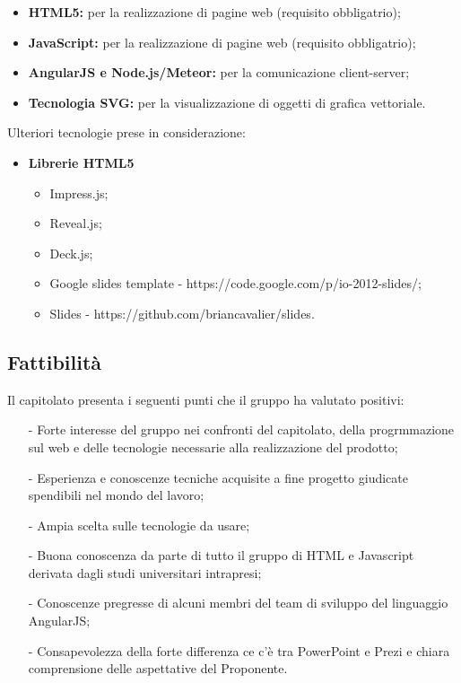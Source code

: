 \begin{itemize}
	\item \textbf{HTML5:} per la realizzazione di pagine web (requisito obbligatrio);
	\item \textbf{JavaScript:} per la realizzazione di pagine web (requisito obbligatrio);
	\item \textbf{AngularJS e Node.js/Meteor:} per la comunicazione client-server;
	\item \textbf{Tecnologia SVG:} per la visualizzazione di oggetti di grafica vettoriale.
\end{itemize}
Ulteriori tecnologie prese in considerazione:
\begin{itemize}
	\item \textbf{Librerie HTML5}
	\begin{itemize}
		\item Impress.js;
		\item Reveal.js;
		\item Deck.js;
		\item Google slides template - https://code.google.com/p/io-2012-slides/;
		\item Slides - https://github.com/briancavalier/slides.
	\end{itemize}
\end{itemize}

\subsection{Fattibilità}
Il capitolato presenta i seguenti punti che il gruppo ha valutato positivi:
\begin{itemize}
	\item[-] Forte interesse del gruppo nei confronti del capitolato, della progrmmazione sul web e delle tecnologie necessarie alla realizzazione del prodotto;
	\item[-] Esperienza e conoscenze tecniche acquisite a fine progetto giudicate spendibili nel mondo del lavoro;
	\item[-] Ampia scelta sulle tecnologie da usare;
	\item[-] Buona conoscenza da parte di tutto il gruppo di HTML e Javascript derivata dagli studi universitari intrapresi;
	\item[-] Conoscenze pregresse di alcuni membri del team di sviluppo del linguaggio AngularJS;
	\item[-] Consapevolezza della forte differenza ce c'è tra PowerPoint e Prezi e chiara comprensione delle aspettative del Proponente.
\end{itemize}

